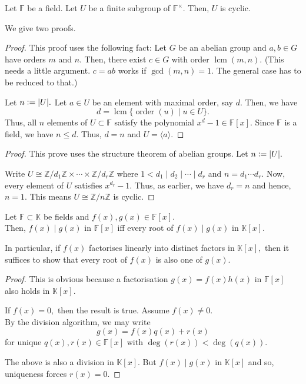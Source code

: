 \begin{thm} \label{thm:finsubgroupcyclic}
    Let $\mathbb{F}$ be a field. Let $U$ be a finite subgroup of $\mathbb{F}^\times.$ Then, $U$ is cyclic. 
\end{thm}
We give two proofs.
\begin{proof} 
    This proof uses the following fact: Let $G$ be an abelian group and $a, b \in G$ have orders $m$ and $n.$ Then, there exist $c \in G$ with order $\operatorname{lcm}(m, n).$ (This needs a little argument. $c = ab$ works if $\gcd(m, n) = 1.$ The general case has to be reduced to that.)

    Let $n \vcentcolon= {\left\lvert U \right\lvert}.$ Let $a \in U$ be an element with maximal order, say $d.$ Then, we have
    \begin{equation*} 
        d = \operatorname{lcm} \{\operatorname{order}(u) \mid u \in U\}.
    \end{equation*}
    Thus, all $n$ elements of $U \subset \mathbb{F}$ satisfy the polynomial $x^d - 1 \in \mathbb{F}[x].$ Since $\mathbb{F}$ is a field, we have $n \le d.$ Thus, $d = n$ and $U = \langle a\rangle.$
\end{proof}

\begin{proof} 
    This prove uses the structure theorem of abelian groups. Let $n \vcentcolon= {\left\lvert U \right\lvert}.$

    Write $U \cong \mathbb{Z}/d_1\mathbb{Z} \times \cdots \times \mathbb{Z}/d_r\mathbb{Z}$ where $1 < d_1 \mid d_2 \mid \cdots \mid d_r$ and $n = d_1 \cdots d_r.$ Now, every element of $U$ satisfies $x^{d_r} - 1.$ Thus, as earlier, we have $d_r = n$ and hence, $n = 1.$ This means $U \cong \mathbb{Z}/n\mathbb{Z}$ is cyclic. 
\end{proof}

\begin{prop} \label{prop:divisibilityofpoly}
    Let $\mathbb{F} \subset \mathbb{K}$ be fields and $f(x), g(x) \in \mathbb{F}[x].$ \\
    Then, $f(x) \mid g(x)$ in $\mathbb{F}[x]$ iff every root of $f(x) \mid g(x)$ in $\mathbb{K}[x].$

    In particular, if $f(x)$ factorises linearly into distinct factors in $\mathbb{K}[x],$ then it suffices to show that every root of $f(x)$ is also one of $g(x).$
\end{prop}

\begin{proof}
    \forward This is obvious because a factorisation $g(x) = f(x)h(x)$ in $\mathbb{F}[x]$ also holds in $\mathbb{K}[x].$

    \backward If $f(x) = 0,$ then the result is true. Assume $f(x) \neq 0.$ \\
    By the division algorithm, we may write
    \begin{equation*} 
        g(x) = f(x)q(x) + r(x)
    \end{equation*}
    for unique $q(x), r(x) \in \mathbb{F}[x]$ with $\deg(r(x)) < \deg(q(x)).$

    The above is also a division in $\mathbb{K}[x].$ But $f(x) \mid g(x)$ in $\mathbb{K}[x]$ and so, uniqueness forces $r(x) = 0.$
\end{proof} 